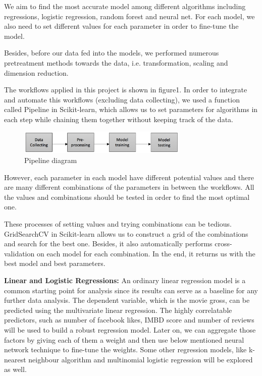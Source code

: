 We aim to find the most accurate model among different algorithms including regressions, logistic regression, random forest and neural net. For each model, we also need to set different values for each parameter in order to fine-tune the model.
 
Besides, before our data fed into the models, we performed numerous pretreatment methods towards the data, i.e. transformation, scaling and dimension reduction.
 
The workflows applied in this project is shown in figure1. In order to integrate and automate this workflows (excluding data collecting), we used a function called Pipeline in Scikit-learn, which allows us to set parameters for algorithms in each step while chaining them together without keeping track of the data.

\begin{figure}[h]
\centering
\includegraphics[width=3.2in]{figures/pipeline}
\caption{Pipeline diagram}
\label{fig:pipeline}
\end{figure}
 
However, each parameter in each model have different potential values and there are many different combinations of the parameters in between the workflows. All the values and combinations should be tested in order to find the most optimal one.
 
These processes of setting values and trying combinations can be tedious. GridSearchCV in Scikit-learn allows us to construct a grid of the combinations and search for the best one. Besides, it also automatically performs cross-validation on each model for each combination. In the end, it returns us with the best model and best parameters.

\textbf{Linear and Logistic Regressions:}
An ordinary linear regression model is a common starting point for analysis since its results can serve as a baseline for any further data analysis. The dependent variable, which is the movie gross, can be predicted using the multivariate linear regression. The highly correlatable predictors, such as number of facebook likes, IMBD score and number of reviews will be used to build a robust regression model. Later on, we can aggregate those factors by giving each of them a weight and then use below mentioned neural network technique to fine-tune the weights. Some other regression models, like k-nearest neighbour algorithm and multinomial logistic regression will be explored as well.

